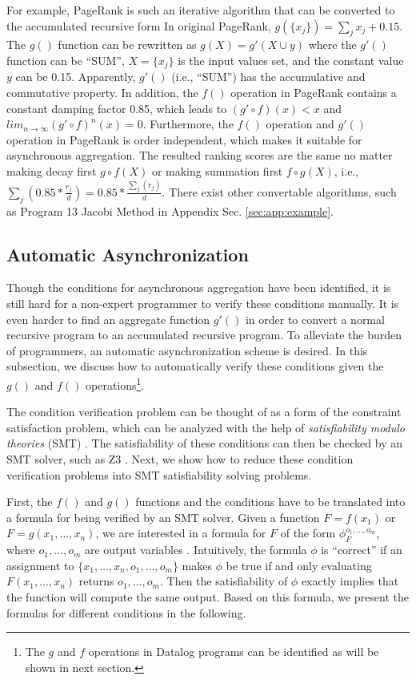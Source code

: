 For example, PageRank is such an iterative algorithm that can be converted to the accumulated recursive form %
In original PageRank, $g(\{x_j\})=\sum_j{x_j}+0.15$. The $g()$ function can be rewritten as $g(X)=g'(X\cup y)$ where the $g'()$ function can be ``SUM'', $X=\{x_j\}$ is the input values set, and the constant value $y$ can be 0.15. Apparently, $g'()$ (i.e., ``SUM'') has the accumulative and commutative property. In addition, the $f()$ operation in PageRank contains a constant damping factor 0.85, which leads to $(g'\circ f)(x)<x$ and $lim_{n\rightarrow\infty}(g'\circ f)^n(x)=0$. Furthermore, the $f()$ operation and $g'()$ operation in PageRank is order independent, which makes it suitable for asynchronous aggregation. The resulted ranking scores are the same no matter making decay first $g\circ f(X)$ or making summation first $f\circ g(X)$, i.e., $\sum_j(0.85*\frac{r_j}{d})=0.85*\frac{\sum_j(r_j)}{d}$. There exist other convertable algorithms, such as Program 13 Jacobi Method in Appendix Sec. \ref{sec:app:example}.


\subsection{Automatic Asynchronization}
\label{sec:async:autoasync}

Though the conditions for asynchronous aggregation have been identified, it is still hard for a non-expert programmer to verify these conditions manually. It is even harder to find an aggregate function $g'()$ in order to convert a normal recursive program to an accumulated recursive program.
 To alleviate the burden of programmers, an automatic asynchronization scheme is desired. In this subsection, we discuss how to automatically verify these conditions given the $g()$ and $f()$ operations\footnote{The $g$ and $f$ operations in Datalog programs can be identified as will be shown in next section.}.

The condition verification problem can be thought of as a form of the constraint satisfaction problem, which can be analyzed with the help of \emph{satisfiability modulo theories} (SMT) \cite{53e486195688442995f82bfe28c55731}. The satisfiability of these conditions can then be checked by an SMT solver, such as Z3 \cite{DeMoura:2008:ZES:1792734.1792766}. Next, we show how to reduce these condition verification problems into SMT satisfiability solving problems.

First, the $f()$ and $g()$ functions and the conditions have to be translated into a formula for being verified by an SMT solver. Given a function $F=f(x_1)$ or $F=g(x_1,\ldots,x_n)$, we are interested in a formula for $F$ of the form $\phi_F^{o_1,\ldots,o_m}$, where $o_1,\ldots,o_m$ are output variables \cite{Liu:2014:ADP:2670979.2670980}. Intuitively, the formula $\phi$ is ``correct'' if an assignment to $\{x_1,\ldots,x_n,o_1,\ldots,o_m\}$ makes $\phi$ be true if and only evaluating $F(x_1,\ldots,x_n)$ returns $o_1,\ldots,o_m$. Then the satisfiability of $\phi$ exactly implies that the function will compute the same output. Based on this formula, we present the formulas for different conditions in the following.

